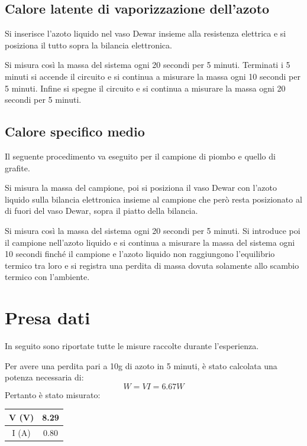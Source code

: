 \documentclass[a4paper,12pt]{article}
\begin{document}
\subsection{Calore latente di vaporizzazione dell'azoto}
Si inserisce l'azoto liquido nel vaso Dewar insieme alla resistenza elettrica e si posiziona il tutto
sopra la bilancia elettronica.

Si misura così la massa del sistema ogni 20 secondi per 5 minuti. Terminati i 5 minuti si accende il circuito
e si continua a misurare la massa ogni 10 secondi per 5 minuti. Infine si spegne il circuito e si continua
a misurare la massa ogni 20 secondi per 5 minuti.


\subsection{Calore specifico medio}

Il seguente procedimento va eseguito per il campione di piombo e quello di grafite.

Si misura la massa del campione, poi si posiziona il vaso Dewar con l'azoto liquido sulla bilancia
elettronica insieme al campione che però resta posizionato al di fuori del vaso Dewar, sopra il piatto della bilancia.

Si misura così la massa del sistema ogni 20 secondi per 5 minuti. Si introduce poi il campione nell'azoto
liquido e si continua a misurare la massa del sistema ogni 10 secondi finché il campione e l'azoto liquido
non raggiungono l'equilibrio termico tra loro e si registra una perdita di massa dovuta solamente allo scambio
termico con l'ambiente.

\section{Presa dati}
In seguito sono riportate tutte le misure raccolte durante l'esperienza.

Per avere una perdita pari a 10g di azoto in 5 minuti, è stato calcolata una potenza necessaria di:
\begin{equation*}
    W = VI = 6.67W
\end{equation*}
Pertanto è stato misurato:

\begin{table}[h]
    \centering
    \begin{tabular}{|c|c|} \hline
        V (V) & 8.29 \\ \hline
        I (A) & 0.80 \\ \hline
    \end{tabular}
\end{table}
\end{document}
